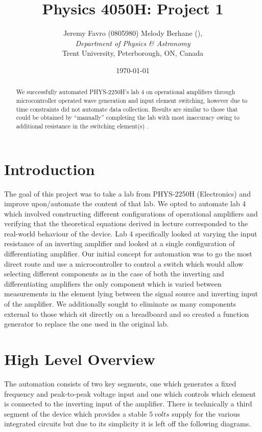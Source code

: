 \documentclass[10pt, twocolumn]{article}
\title{Physics 4050H: Project 1}
\author{Jeremy Favro (0805980) Melody Berhane (), \\\emph{Department of Physics \& Astronomy}\\ Trent University, Peterborough, ON, Canada}
\date{\today}
\theoremstyle{definition}
\begin{document}
\maketitle
\listoftodos

\begin{abstract}
  We successfully automated PHYS-2250H's lab 4 on operational amplifiers through microcontroller operated
  wave generation and input element switching, however due to time constraints did not automate data collection. Results are similar to those that could be obtained
  by ``manually'' completing the lab with most inaccuracy owing to additional resistance in the switching element(s) .
\end{abstract}
\section{Introduction}
The goal of this project was to take a lab from PHYS-2250H (Electronics) and improve upon/automate the content of that lab. We opted to 
automate lab 4 which involved constructing different configurations of operational amplifiers and verifying that the theoretical equations 
derived in lecture corresponded to the real-world behaviour of the device. Lab 4 specifically looked at varying the input resistance of an
inverting amplifier and looked at a single configuration of differentiating amplifier. Our initial concept for automation was to go the most direct route
and use a microcontroller to control a switch which would allow selecting different components as in the case of both the inverting and differentiating amplifiers
the only component which is varied between measurements in the element lying between the signal source and inverting input of the amplifier. We additionally
sought to eliminate as many components external to those which sit directly on a breadboard and so created a function generator to replace the one used in the original lab.
\section{High Level Overview}
The automation consists of two key segments, one which generates a fixed frequency and peak-to-peak voltage input and one
which controls which element is connected to the inverting input of the amplifier. There is technically a third segment
of the device which provides a stable $\qty{5}{\unit{volts}}$ supply for the various integrated circuits but due to its simplicity
it is left off the following diagrams.
\end{document}

